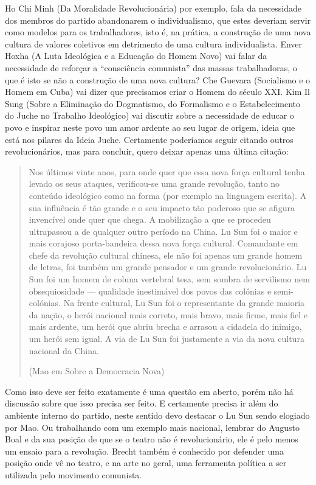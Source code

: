 Ho Chi Minh (Da Moralidade Revolucionária) por exemplo, fala da necessidade dos membros do partido abandonarem o individualismo, que estes deveriam servir como modelos para os trabalhadores, isto é, na prática, a construção de uma nova cultura de valores coletivos em detrimento de uma cultura individualista. Enver Hoxha (A Luta Ideológica e a Educação do Homem Novo) vai falar da necessidade de reforçar a “consciência comunista” das massas trabalhadoras, o que é isto se não a construção de uma nova cultura? Che Guevara (Socialismo e o Homem em Cuba) vai dizer que precisamos criar o Homem do século XXI. Kim Il Sung (Sobre a Eliminação do Dogmatismo, do Formalismo e o Estabelecimento do Juche no Trabalho Ideológico) vai discutir sobre a necessidade de educar o povo e inspirar neste povo um amor ardente ao seu lugar de origem, ideia que está nos pilares da Ideia Juche. Certamente poderíamos seguir citando outros revolucionários, mas para concluir, quero deixar apenas uma última citação:

\begin{quote}
Nos últimos vinte anos, para onde quer que essa nova força cultural tenha levado os seus ataques, verificou-se uma grande revolução, tanto no conteúdo ideológico como na forma (por exemplo na linguagem escrita). A sua influência é tão grande e o seu impacto tão poderoso que se afigura invencível onde quer que chega. A mobilização a que se procedeu ultrapassou a de qualquer outro período na China. Lu Sun foi o maior e mais corajoso porta-bandeira dessa nova força cultural. Comandante em chefe da revolução cultural chinesa, ele não foi apenas um grande homem de letras, foi também um grande pensador e um grande revolucionário. Lu Sun foi um homem de coluna vertebral tesa, sem sombra de servilismo nem obsequiosidade — qualidade inestimável dos povos das colónias e semi-colónias. Na frente cultural, Lu Sun foi o representante da grande maioria da nação, o herói nacional mais correto, mais bravo, mais firme, mais fiel e mais ardente, um herói que abriu brecha e arrasou a cidadela do inimigo, um herói sem igual. A via de Lu Sun foi justamente a via da nova cultura nacional da China.

(Mao em Sobre a Democracia Nova)
\end{quote}

Como isso deve ser feito exatamente é uma questão em aberto, porém não há discussão sobre que isso precisa ser feito. E certamente precisa ir além do ambiente interno do partido, neste sentido devo destacar o Lu Sun sendo elogiado por Mao. Ou trabalhando com um exemplo mais nacional, lembrar do Augusto Boal e da sua posição de que se o teatro não é revolucionário, ele é pelo menos um ensaio para a revolução. Brecht também é conhecido por defender uma posição onde vê no teatro, e na arte no geral, uma ferramenta política a ser utilizada pelo movimento comunista.


